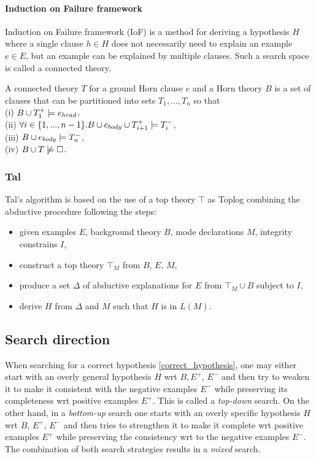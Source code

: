 \paragraph{Induction on Failure framework\cite{kimber2012learning}}
Induction on Failure framework (IoF) is a method for deriving a hypothesis $H$ where a single clause $h \in H$ does not necessarily need to explain an example $e \in E$, but an example can be explained by multiple clauses. Such a search space is called a connected theory.
\begin{defn}
A connected theory $T$ for a ground Horn clause $e$ and a Horn theory $B$ is a set of clauses that can be partitioned into sets $T_1, ..., T_n$ so that\\
(i) $B \cup T_1^+ \models e_{head}$,\\
(ii) $\forall i \in \{1, ..., n-1\}. B \cup e_{body} \cup T_{i+1}^+ \models T_i^-$,\\
(iii) $B \cup e_{body} \models T_n^-$,\\
(iv) $B \cup T \not\models \square$.
\end{defn}

\subsubsection{Tal\cite{corapi2011nonmonotonic}}
Tal's algorithm is based on the use of a top theory $\top$ as Toplog combining the abductive procedure following the steps:
\begin{itemize}
\item given examples $E$, background theory $B$, mode declarations $M$, integrity constrains $I$,
\item construct a top theory $\top_M$ from $B$, $E$, $M$,
\item produce a set $\Delta$ of abductive explanations for $E$ from $\top_M \cup B$ subject to $I$,
\item derive $H$ from $\Delta$ and $M$ such that $H$ is in $L(M)$.
\end{itemize}

\subsection{Search direction\cite{nienhuys1997foundations}}
When searching for a correct hypothesis \ref{correct_hypothesis}, one may either start with an overly general hypothesis $H$ wrt $B, E^+$, $E^-$ and then try to weaken it to make it consistent with the negative examples $E^-$ while preserving its completeness wrt positive examples $E^+$. This is called a \emph{top-down} search.
On the other hand, in a \emph{bottom-up} search one starts with an overly specific hypothesis $H$ wrt $B$, $E^+$, $E^-$ and then tries to strengthen it to make it complete wrt positive examples $E^+$ while preserving the consistency wrt to the negative examples $E^-$.
The combination of both search strategies results in a \emph{mixed} search.


